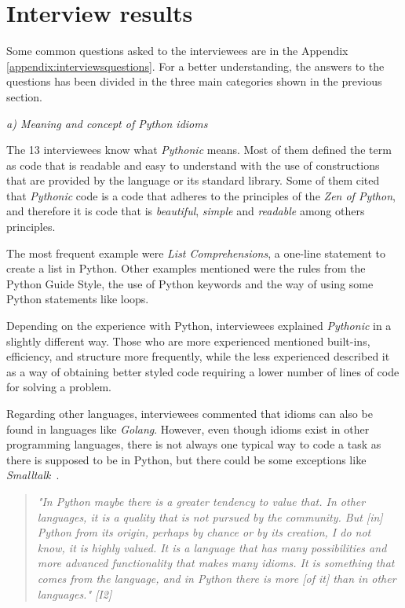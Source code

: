 \documentclass[a4paper]{article}
\begin{document}
\section{Interview results}

Some common questions asked to the interviewees are in the Appendix \ref{appendix:interviewsquestions}. For a better understanding, the answers to the questions has been divided in the three main categories shown in the previous section.

\textit{a) Meaning and concept of Python idioms}

The 13 interviewees know what \textit{Pythonic} means. Most of them defined the term as code that is readable and easy to understand with the use of constructions that are provided by the language or its standard library.
Some of them cited that \textit{Pythonic} code is a code that adheres to the principles of the \textit{Zen of Python}, and therefore it is code that is \textit{beautiful}, \textit{simple} and \textit{readable} among others principles.

The most frequent example were \textit{List Comprehensions}, a one-line statement to create a list in Python. Other examples mentioned were the rules from the Python Guide Style, the use of Python keywords and the way of using some Python statements like loops.


Depending on the experience with Python, interviewees explained \textit{Pythonic} in a slightly different way. Those who are more experienced mentioned built-ins, efficiency, and structure more frequently, while the less experienced described it as a way of obtaining better styled code requiring a lower number of lines of code for solving a problem. 

Regarding other languages, interviewees commented that idioms can also be found in languages like \textit{Golang}. However, even though idioms exist in other programming languages, there is not always one typical way to code a task as there is supposed to be in Python, but there could be some exceptions like \textit{Smalltalk}~\cite{BeckSmalltalk}.
\begin{quote}
\textit{
    "In Python maybe there is a greater tendency to value that. In other languages, it is a quality that is not pursued by the community. But [in] Python from its origin, perhaps by chance or by its creation, I do not know, it is highly valued. It is a language that has many possibilities and more advanced functionality that makes many idioms. It is something that comes from the language, and in Python there is more [of it] than in other languages." [I2]
}
\end{quote}
\end{document}
